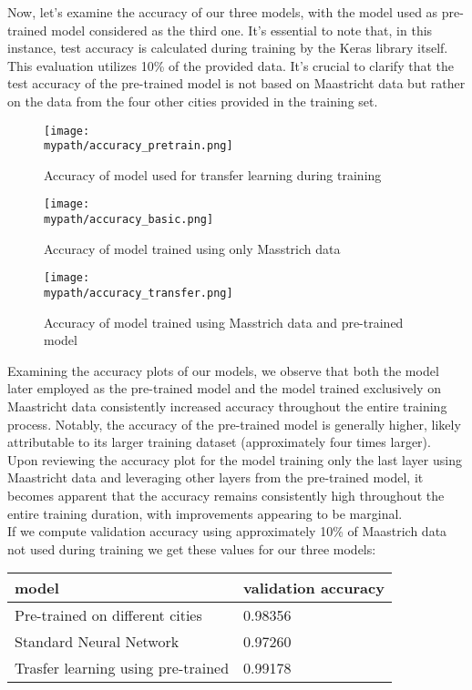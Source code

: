 \documentclass[a4paper]{article}
\begin{document}
	Now, let's examine the accuracy of our three models, with the model used as pre-trained model considered as the third one. It's essential to note that, in this instance, test accuracy is calculated during training by the Keras library itself. This evaluation utilizes 10\% of the provided data. It's crucial to clarify that the test accuracy of the pre-trained model is not based on Maastricht data but rather on the data from the four other cities provided in the training set.
	
	
	\begin{figure}[h!]
		\centerline{\texttt{[image: \\mypath/accuracy\_pretrain.png]}}
		\caption{Accuracy of model used for transfer learning during training}
	\end{figure}

	\begin{figure}[h!]
		\centerline{\texttt{[image: \\mypath/accuracy\_basic.png]}}
		\caption{Accuracy of model trained using only Masstrich data}
	\end{figure}

	\begin{figure}[h!]
		\centerline{\texttt{[image: \\mypath/accuracy\_transfer.png]}}
		\caption{Accuracy of model trained using Masstrich data and pre-trained model}
	\end{figure}
	\newpage
	Examining the accuracy plots of our models, we observe that both the model later employed as the pre-trained model and the model trained exclusively on Maastricht data consistently increased accuracy throughout the entire training process. Notably, the accuracy of the pre-trained model is generally higher, likely attributable to its larger training dataset (approximately four times larger).
	\\
	
	Upon reviewing the accuracy plot for the model training only the last layer using Maastricht data and leveraging other layers from the pre-trained model, it becomes apparent that the accuracy remains consistently high throughout the entire training duration, with improvements appearing to be marginal.   
	\\
	
	If we compute validation accuracy using approximately 10\% of Maastrich data not used during training we get these values for our three models:
	\begin{table}[!h]
		\begin{tabular}{|l|l|}
			\hline
			model &  validation accuracy  \\ \hline
			Pre-trained on different cities  & 0.98356 \\ \hline
			Standard Neural Network & 0.97260 \\ \hline
			Trasfer learning using pre-trained &  0.99178 \\ \hline
		\end{tabular}
	\end{table} 
\end{document}
